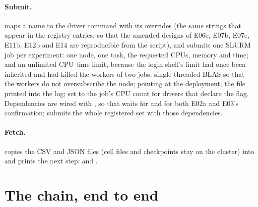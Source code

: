 \paragraph{Submit.}  maps a name to the driver
command with its  overrides (the same strings that appear in the registry
entries, so that the amended designs of E06c, E07b, E07c, E11b, E12b and E14 are
reproducible from the script), and submits one SLURM job per experiment: one node, one
task, the requested CPUs, memory and time;  and an unlimited CPU
time limit, because the login shell's limit had once been inherited and had killed the
workers of two jobs; single-threaded BLAS so that the workers do not oversubscribe the
node;  pointing at the deployment; the  file printed into
the log;  set to the job's CPU count for drivers that declare the flag.
Dependencies are wired with , so that  waits for
 and  for both E02a and E03's confirmation;  submits
the whole registered set with those dependencies.

\paragraph{Fetch.}  copies the CSV and JSON files
(cell files and checkpoints stay on the cluster) into  and prints the
next step:  and .

\section{The chain, end to end}
\label{sec:chain}

